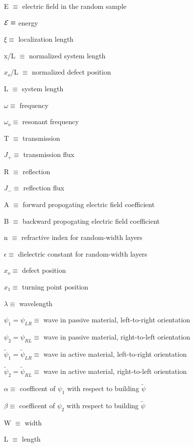 
E $\equiv$ electric field in the random sample

$ {\cal E}  \equiv$ energy

$ \xi \equiv$ localization length

x/L $\equiv$ normalized system length

$x_o$/L $\equiv$ normalized defect position

L  $\equiv$ system length

$\omega \equiv$ frequency

$\omega_o \equiv$ resonant frequency

T  $\equiv$ transmission

$J_+ \equiv$ transmission flux

R  $\equiv$ reflection

$J_- \equiv$ reflection flux

A $\equiv$ forward propogating electric field coefficient

B $\equiv$ backward propogating electric field coefficient

n $\equiv$ refractive index for random-width layers

$\epsilon \equiv$ dielectric constant for random-width layers

$x_o \equiv$ defect position

$x_1 \equiv$ turning point position

$\lambda \equiv$ wavelength

$\psi _1 = \psi _{LR} \equiv$ wave in passive material, left-to-right orientation

$\psi _2 = \psi _{RL} \equiv$ wave in passive material, right-to-left orientation

$\tilde{ \psi} _1 = \tilde{\psi} _{LR} \equiv$ wave in active material, left-to-right orientation

$\tilde{ \psi} _2 = \tilde{\psi} _{RL} \equiv$ wave in active material, right-to-left orientation

$\alpha \equiv$ coefficent of $\psi _1 $ with respect to building $\tilde{\psi}$

$\beta \equiv$ coefficent of $\psi _2 $ with respect to building $\tilde{\psi}$


W $\equiv$ width

L $\equiv$ length

